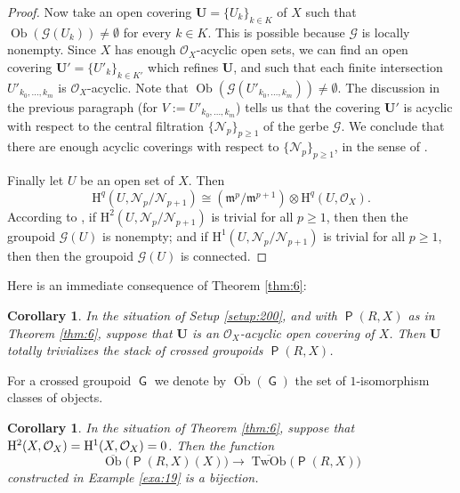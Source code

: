 \documentclass[a4paper, 10pt]{amsart}
\newtheorem{cor}[equation]{Corollary}
\theoremstyle{definition}
\numberwithin{equation}{section}
\newcommand{\opn}{\operatorname}
\newcommand{\cat}[1]{\operatorname{\mathsf{#1}}}
\newcommand{\ol}{\overline}
\newcommand{\mfrak}[1]{\mathfrak{#1}}
\newcommand{\mcal}[1]{\mathcal{#1}}
\newcommand{\mrm}[1]{\mathrm{#1}}
\newcommand{\tup}[1]{\textup{#1}}
\newcommand{\bsym}[1]{\boldsymbol{#1}}
\newcommand{\ot}{\otimes}
\newcommand{\m}{\mfrak{m}}
\newcommand{\gerbe}[1]{\bsym{\mcal{#1}}}
\newcommand{\twocat}[1]{\operatorname{\bsym{\cat{#1}}}}
\newcommand{\lb}{\linebreak}
\begin{document}
\begin{proof}
Now take an open covering
$\bsym{U} = \{ U_k \}_{k \in K}$ of $X$ such that 
$\opn{Ob} (\gerbe{G}(U_k)) \neq \emptyset$
for every $k \in K$. This is possible because $\gerbe{G}$ is locally nonempty.
Since $X$ has enough $\mcal{O}_X$-acyclic open sets, we can find an open
covering $\bsym{U}' = \{ U'_k \}_{k \in K'}$ which refines $\bsym{U}$, and such
that each finite intersection
$U'_{k_0, \ldots, k_m}$ is $\mcal{O}_X$-acyclic. Note that
$\opn{Ob} (\gerbe{G}(U'_{k_0, \ldots, k_m})) \neq \emptyset$.
The discussion in the previous paragraph (for 
$V := U'_{k_0, \ldots, k_m}$) tells us that the covering $\bsym{U}'$ is
acyclic with respect to the central filtration 
$\{ \gerbe{N}_p \}_{p \geq 1}$ of the gerbe $\gerbe{G}$.
We conclude that there are enough acyclic coverings with respect to 
$\{ \gerbe{N}_p \}_{p \geq 1}$, in the sense of \cite[Definition 6.9]{Ye4}.

Finally let $U$ be an open set of $X$. Then
\[ \mrm{H}^q(U, \gerbe{N}_p / \gerbe{N}_{p+1}) \cong
(\m^{p} / \m^{p+1}) \ot \mrm{H}^q(U, \mcal{O}_X) . \]
According to \cite[Theorem 6.10]{Ye4}, if 
$\mrm{H}^2(U, \gerbe{N}_p / \gerbe{N}_{p+1})$
is trivial for all $p \geq 1$, then then the groupoid
$\gerbe{G}(U)$ is nonempty; and if 
$\mrm{H}^1(U, \gerbe{N}_p / \gerbe{N}_{p+1})$
is trivial for all $p \geq 1$, then then the groupoid
$\gerbe{G}(U)$ is connected.
\end{proof}

Here is an immediate consequence of Theorem \tup{\ref{thm:6}}:

\begin{cor} \label{cor:4}
In the situation of Setup \tup{\ref{setup:200}}, and with 
$\twocat{P}(R, X)$ as in Theorem \tup{\ref{thm:6}}, suppose that
$\bsym{U}$ is an $\mcal{O}_X$-acyclic open covering of $X$. Then
$\bsym{U}$ totally trivializes the stack of crossed groupoids 
$\twocat{P}(R, X)$.
\end{cor}

For a crossed groupoid $\cat{G}$ we denote by 
$\ol{\opn{Ob}}(\cat{G})$ the set of $1$-isomorphism classes of objects.

\begin{cor} \label{cor:7}
In the situation of Theorem \tup{\ref{thm:6}}, suppose that
$\mrm{H}^2(X, \mcal{O}_X) = \lb \mrm{H}^1(X, \mcal{O}_X) = 0$.
Then the function
\begin{equation} \label{eqn:40}
\ol{\opn{Ob}} \bigl( \twocat{P}(R, X)(X) \bigr) \to
\ol{\opn{TwOb}} \bigl( \twocat{P}(R, X) \bigr)
\end{equation}
constructed in Example \tup{\ref{exa:19}} is a bijection.
\end{cor}
\end{document}
